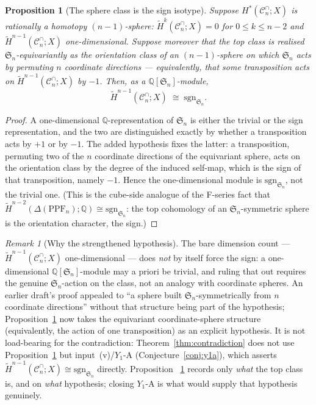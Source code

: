 \documentclass[11pt,oneside]{amsart}
\theoremstyle{plain}
\newtheorem{proposition}[theorem]{Proposition}
\theoremstyle{definition}
\theoremstyle{remark}
\newtheorem{remark}[theorem]{Remark}
\theoremstyle{honeststyle}
\newcommand{\sgn}{\mathrm{sgn}}
\newcommand{\Sym}{\mathfrak{S}}
\newcommand{\Q}{\mathbb{Q}}
\newcommand{\Cn}{\mathcal{C}^{\cap}_n}
\begin{document}
\begin{proposition}[The sphere class is the sign isotype]
\label{prop:sphere-sgn}
Suppose $H^{*}(\Cn;X)$ is rationally a homotopy $(n-1)$-sphere:
$\widetilde H^{k}(\Cn;X)=0$ for $0\le k\le n-2$ and $\widetilde
H^{n-1}(\Cn;X)$ one-dimensional. Suppose moreover that the top class
is realised $\Sym_n$-equivariantly as the orientation class of an
$(n-1)$-sphere on which $\Sym_n$ acts by permuting $n$ coordinate
directions --- equivalently, that some transposition acts on
$\widetilde H^{n-1}(\Cn;X)$ by $-1$. Then, as a $\Q[\Sym_n]$-module,
\[
  \widetilde H^{n-1}(\Cn;X)\;\cong\;\sgn_{\Sym_n}.
\]
\end{proposition}

\begin{proof}
A one-dimensional $\Q$-representation of $\Sym_n$ is either the trivial
or the sign representation, and the two are distinguished exactly by
whether a transposition acts by $+1$ or by $-1$. The added hypothesis
fixes the latter: a transposition, permuting two of the $n$ coordinate
directions of the equivariant sphere, acts on the orientation class by
the degree of the induced self-map, which is the sign of that
transposition, namely $-1$. Hence the one-dimensional module is
$\sgn_{\Sym_n}$, not the trivial one. (This is the cube-side analogue
of the F-series fact that $\widetilde
H^{n-2}(\Delta(\mathrm{PPF}_n);\Q)\cong\sgn_{\Sym_n}$: the top
cohomology of an $\Sym_n$-symmetric sphere is the orientation
character, the sign.)
\end{proof}

\begin{remark}[Why the strengthened hypothesis]
\label{rem:sphere-sgn-hyp}
The bare dimension count --- $\widetilde H^{n-1}(\Cn;X)$
one-dimensional --- does \emph{not} by itself force the sign: a
one-dimensional $\Q[\Sym_n]$-module may a priori be trivial, and
ruling that out requires the genuine $\Sym_n$-action on the class, not
an analogy with coordinate spheres. An earlier draft's proof appealed
to ``a sphere built $\Sym_n$-symmetrically from $n$ coordinate
directions'' without that structure being part of the hypothesis;
Proposition~\ref{prop:sphere-sgn} now takes the equivariant
coordinate-sphere structure (equivalently, the action of one
transposition) as an explicit hypothesis. It is not load-bearing for
the contradiction: Theorem~\ref{thm:contradiction} does not use
Proposition~\ref{prop:sphere-sgn} but input~(v)/$Y_1$-A
(Conjecture~\ref{conj:y1a}), which asserts $\widetilde
H^{n-1}(\Cn;X)\cong\sgn_{\Sym_n}$ directly. Proposition~%
\ref{prop:sphere-sgn} records only \emph{what} the top class is, and
on \emph{what} hypothesis; closing $Y_1$-A is what would supply that
hypothesis genuinely.
\end{remark}
\end{document}
